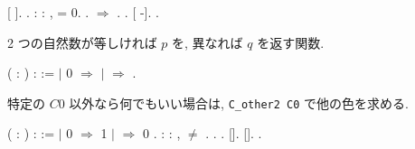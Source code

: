 \documentclass[12pt]{report}
\begin{document}
\begin{coqdoccode}
\coqdocnoindent
{} [ ].\coqdoceol
\coqdocnoindent
{}.\coqdoceol
\coqdocemptyline
\coqdocnoindent
{}  : \coqdockw{\ensuremath{\forall}}  : ,    = 0.\coqdoceol
\coqdocnoindent
{}.\coqdoceol
\coqdocnoindent
{} \ensuremath{\Rightarrow} .\coqdoceol
\coqdocnoindent
{} .\coqdoceol
\coqdocnoindent
{} [ -].\coqdoceol
\coqdocnoindent
{}.\coqdoceol
\coqdocemptyline
\end{coqdoccode}

2 つの自然数が等しければ $p$ を, 異なれば $q$ を返す関数.
  \begin{coqdoccode}
\coqdocemptyline
\coqdocnoindent
{}  (    : ) :  :=\coqdoceol
\coqdocnoindent
{}    \coqdoceol
\coqdocindent{1.00em}
\ensuremath{|} 0 \ensuremath{\Rightarrow} \coqdoceol
\coqdocindent{1.00em}
\ensuremath{|} \coqdocvar{\_} \ensuremath{\Rightarrow} \coqdoceol
\coqdocnoindent
{}.\coqdoceol
\coqdocemptyline
\end{coqdoccode}

特定の $C0$ 以外なら何でもいい場合は, \verb|C_other2 C0| で他の色を求める.
  \begin{coqdoccode}
\coqdocemptyline
\coqdocnoindent
{}  ( : ) :  :=\coqdoceol
\coqdocnoindent
{}  \coqdoceol
\coqdocindent{1.00em}
\ensuremath{|} 0 \ensuremath{\Rightarrow} 1\coqdoceol
\coqdocindent{1.00em}
\ensuremath{|} \coqdocvar{\_} \ensuremath{\Rightarrow} 0\coqdoceol
\coqdocnoindent
{}.\coqdoceol
\coqdocemptyline
\coqdocnoindent
{}  : \coqdockw{\ensuremath{\forall}}  : ,  \ensuremath{\not=}  .\coqdoceol
\coqdocnoindent
{}.\coqdoceol
\coqdocnoindent
{} .\coqdoceol
\coqdocnoindent
{} [].\coqdoceol
\coqdocnoindent
{} [].\coqdoceol
\coqdocnoindent
{}.\coqdoceol
\coqdocemptyline
\end{coqdoccode}
\end{document}
